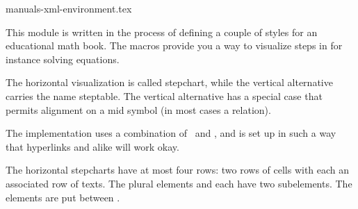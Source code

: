 %
%

\environment manuals-xml-environment.tex

\useMPlibrary [ove]

\usemodule[x][mathml]
\usemodule[m][steps]

\startdocument[title=Steps,author=Hans Hagen,palet=steps]

\startbuffer
\startSTEPchart
{}
   
   
 
  
\stopSTEPchart
\stopbuffer

\startsection[title=Description]

This module is written in the process of defining a couple of styles for an
educational math book. The macros provide you a way to visualize steps in for
instance solving equations.

The horizontal visualization is called stepchart, while the vertical alternative
carries the name steptable. The vertical alternative has a special case that
permits alignment on a mid symbol (in most cases a relation).

The implementation uses a combination of \TEX\ and \METAPOST, and is set up in
such a way that hyperlinks and alike will work okay.

\stopsection

\startsection[title=Structure]

The horizontal stepcharts have at most four rows: two rows of cells with each an
associated row of texts. The plural elements  and  each
have two subelements. The  elements are put between .

